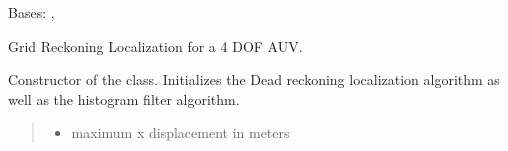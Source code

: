 \documentclass[letterpaper,10pt,english]{sphinxmanual}
\begin{document}
\begin{fulllineitems}
\label{\detokenize{GridLocalization:GL_3DOFDifferentialDrive.GL_3DOFDifferentialDrive}}
\pysigstartsignatures
{}
\pysigstopsignatures
\sphinxAtStartPar
Bases: {\hyperref[\detokenize{GridLocalization:GL.GL}]{}}, {\hyperref[\detokenize{DRLocalization:DR_3DOFDifferentialDrive.DR_3DOFDifferentialDrive}]{}}

\sphinxAtStartPar
Grid Reckoning Localization for a 4 DOF AUV.

\begin{fulllineitems}
\label{\detokenize{GridLocalization:GL_3DOFDifferentialDrive.GL_3DOFDifferentialDrive.__init__}}
\pysigstartsignatures
{}
\pysigstopsignatures
\sphinxAtStartPar
Constructor of the  class. Initializes the Dead reckoning localization algorithm as well as the histogram filter algorithm.
\begin{quote}\begin{description}
\begin{itemize}
\item {} 
\sphinxAtStartPar
{} \textendash{} maximum x displacement in meters


\end{itemize}
\end{description}
\end{quote}
\end{fulllineitems}
\end{fulllineitems}
\end{document}
